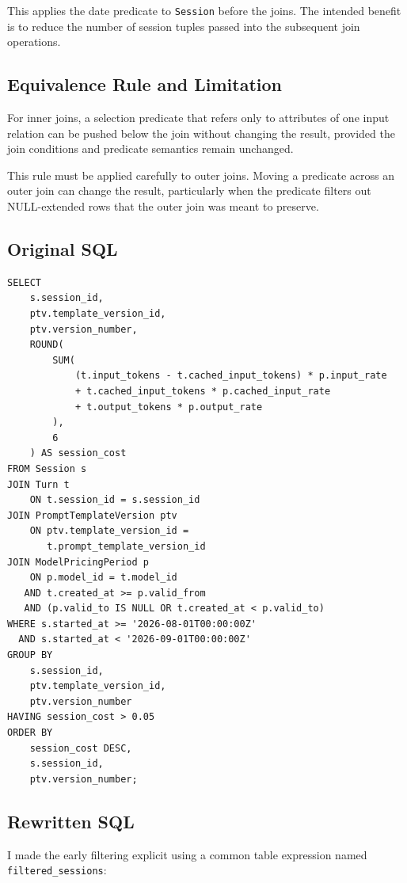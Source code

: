 \documentclass[11pt,a4paper]{article}
\begin{document}
This applies the date predicate to \texttt{Session} before the
joins. The intended benefit is to reduce the number of session
tuples passed into the subsequent join operations.

\subsection{Equivalence Rule and Limitation}

For inner joins, a selection predicate that refers only to
attributes of one input relation can be pushed below the join
without changing the result, provided the join conditions and
predicate semantics remain unchanged.

This rule must be applied carefully to outer joins. Moving a
predicate across an outer join can change the result, particularly
when the predicate filters out NULL-extended rows that the outer
join was meant to preserve.

\subsection{Original SQL}

\begin{lstlisting}[style=sqlstyle]
SELECT
    s.session_id,
    ptv.template_version_id,
    ptv.version_number,
    ROUND(
        SUM(
            (t.input_tokens - t.cached_input_tokens) * p.input_rate
            + t.cached_input_tokens * p.cached_input_rate
            + t.output_tokens * p.output_rate
        ),
        6
    ) AS session_cost
FROM Session s
JOIN Turn t
    ON t.session_id = s.session_id
JOIN PromptTemplateVersion ptv
    ON ptv.template_version_id =
       t.prompt_template_version_id
JOIN ModelPricingPeriod p
    ON p.model_id = t.model_id
   AND t.created_at >= p.valid_from
   AND (p.valid_to IS NULL OR t.created_at < p.valid_to)
WHERE s.started_at >= '2026-08-01T00:00:00Z'
  AND s.started_at < '2026-09-01T00:00:00Z'
GROUP BY
    s.session_id,
    ptv.template_version_id,
    ptv.version_number
HAVING session_cost > 0.05
ORDER BY
    session_cost DESC,
    s.session_id,
    ptv.version_number;
\end{lstlisting}

\subsection{Rewritten SQL}

I made the early filtering explicit using a common table expression
named \texttt{filtered\_sessions}:
\end{document}

